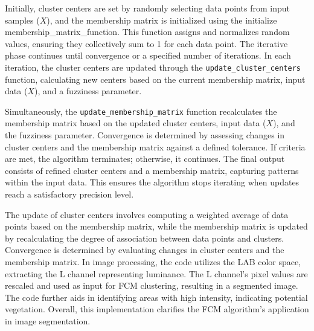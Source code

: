 \documentclass[12pt,a4paper,IEEEtran]{article}
\begin{document}
Initially, cluster centers are set by randomly selecting data points from input samples (\(X\)), and the membership matrix is initialized using the initialize \\membership\_matrix\_function. This function assigns and normalizes random values, ensuring they collectively sum to 1 for each data point. 
The iterative phase continues until convergence or a specified number of iterations. In each iteration, the cluster centers are updated through the \texttt{update\_cluster\_centers} function, calculating new centers based on the current membership matrix, input data (\(X\)), and a fuzziness parameter.

Simultaneously, the \texttt{update\_membership\_matrix} function recalculates the membership matrix based on the updated cluster centers, input data (\(X\)), and the fuzziness parameter. Convergence is determined by assessing changes in cluster centers and the membership matrix against a defined tolerance. If criteria are met, the algorithm terminates; otherwise, it continues. The final output consists of refined cluster centers and a membership matrix, capturing patterns within the input data. This ensures the algorithm stops iterating when updates reach a satisfactory precision level.

The update of cluster centers involves computing a weighted average of data points based on the membership matrix, while the membership matrix is updated by recalculating the degree of association between data points and clusters. Convergence is determined by evaluating changes in cluster centers and the membership matrix. In image processing, the code utilizes the LAB color space, extracting the L channel representing luminance. The L channel's pixel values are rescaled and used as input for FCM clustering, resulting in a segmented image. The code further aids in identifying areas with high intensity, indicating potential vegetation. Overall, this implementation clarifies the FCM algorithm's application in image segmentation. 
\end{document}
